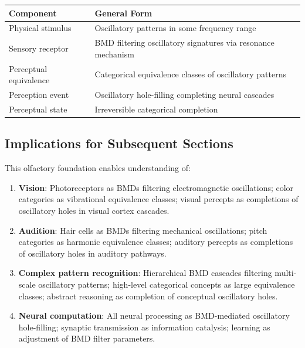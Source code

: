 \documentclass[11pt]{article}
\theoremstyle{remark}
\begin{document}
\begin{center}
\begin{tabular}{p{4cm}p{10cm}}
\toprule
\textbf{Component} & \textbf{General Form} \\
\midrule
Physical stimulus & Oscillatory patterns in some frequency range \\
Sensory receptor & BMD filtering oscillatory signatures via resonance mechanism \\
Perceptual equivalence & Categorical equivalence classes of oscillatory patterns \\
Perception event & Oscillatory hole-filling completing neural cascades \\
Perceptual state & Irreversible categorical completion \\
\bottomrule
\end{tabular}
\end{center}

\subsection{Implications for Subsequent Sections}

This olfactory foundation enables understanding of:

\begin{enumerate}
\item \textbf{Vision}: Photoreceptors as BMDs filtering electromagnetic oscillations; color categories as vibrational equivalence classes; visual percepts as completions of oscillatory holes in visual cortex cascades.

\item \textbf{Audition}: Hair cells as BMDs filtering mechanical oscillations; pitch categories as harmonic equivalence classes; auditory percepts as completions of oscillatory holes in auditory pathways.

\item \textbf{Complex pattern recognition}: Hierarchical BMD cascades filtering multi-scale oscillatory patterns; high-level categorical concepts as large equivalence classes; abstract reasoning as completion of conceptual oscillatory holes.

\item \textbf{Neural computation}: All neural processing as BMD-mediated oscillatory hole-filling; synaptic transmission as information catalysis; learning as adjustment of BMD filter parameters.

\end{enumerate}
\end{document}
